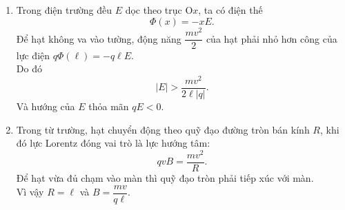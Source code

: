 \begin{loigiai}
\begin{enumerate}[1)]
    \item Trong điện trường đều $E$ dọc theo trục $\mathrm{O}x$, ta có điện thế
    \[\Phi(x)=-xE.\]
    Để hạt không va vào tường, động năng $\dfrac{mv^2}{2}$ của hạt phải nhỏ hơn công của lực điện $q\Phi(\ell)=-q\ell E$.
    \\ Do đó 
    \[\left|E\right| >\dfrac{mv^2}{2\ell \left|q\right|}.\]
     Và hướng của $E$ thỏa mãn $qE<0$.
    \item Trong từ trường, hạt chuyển động theo quỹ đạo đường tròn bán kính $R$, khi đó lực Lorentz đóng vai trò là lực hướng tâm: \[qvB=\dfrac{mv^2}{R}.\]
    Để hạt vừa đủ chạm vào màn thì quỹ đạo tròn phải tiếp xúc với màn.
    \\ Vì vậy $R=\ell$ và $B=\dfrac{mv}{q\ell}$.
    \begin{center}
        
        \begin{tikzpicture}[x=0.75pt,y=0.75pt,yscale=-1,xscale=1]
        

\end{tikzpicture}
\end{center}
\end{enumerate}
\end{loigiai}
